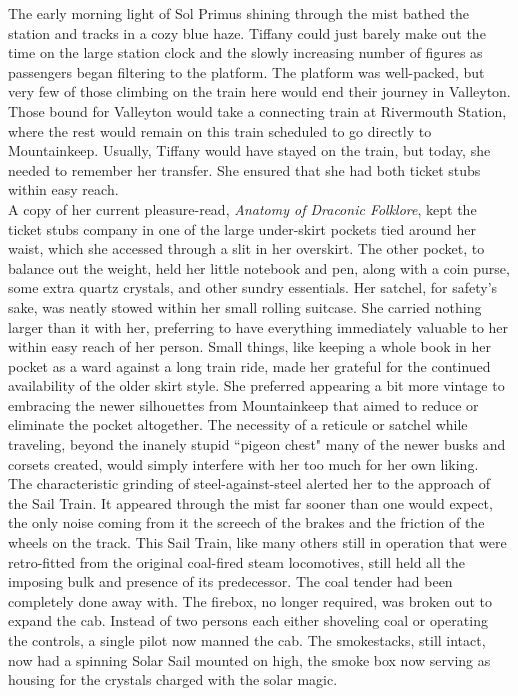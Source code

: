 The early morning light of Sol Primus shining through the mist bathed the station and tracks in a cozy blue haze.
Tiffany could just barely make out the time on the large station clock and the slowly increasing number of figures as passengers began filtering to the platform.
The platform was well-packed, but very few of those climbing on the train here would end their journey in Valleyton.
Those bound for Valleyton would take a connecting train at Rivermouth Station, where the rest would remain on this train scheduled to go directly to Mountainkeep.
Usually, Tiffany would have stayed on the train, but today, she needed to remember her transfer.
She ensured that she had both ticket stubs within easy reach.\\

A copy of her current pleasure-read, \textit{Anatomy of Draconic Folklore}, kept the ticket stubs company in one of the large under-skirt pockets tied around her waist, which she accessed through a slit in her overskirt.
The other pocket, to balance out the weight, held her little notebook and pen, along with a coin purse, some extra quartz crystals, and other sundry essentials.
Her satchel, for safety's sake, was neatly stowed within her small rolling suitcase. 
She carried nothing larger than it with her, preferring to have everything immediately valuable to her within easy reach of her person.
Small things, like keeping a whole book in her pocket as a ward against a long train ride, made her grateful for the continued availability of the older skirt style.
She preferred appearing a bit more vintage to embracing the newer silhouettes from Mountainkeep that aimed to reduce or eliminate the pocket altogether. 
The necessity of a reticule or satchel while traveling, beyond the inanely stupid ``pigeon chest" many of the newer busks and corsets created, would simply interfere with her too much for her own liking.\\

The characteristic grinding of steel-against-steel alerted her to the approach of the Sail Train.
It appeared through the mist far sooner than one would expect, the only noise coming from it the screech of the brakes and the friction of the wheels on the track.
This Sail Train, like many others still in operation that were retro-fitted from the original coal-fired steam locomotives, still held all the imposing bulk and presence of its predecessor.
The coal tender had been completely done away with. 
The firebox, no longer required, was broken out to expand the cab.
Instead of two persons each either shoveling coal or operating the controls, a single pilot now manned the cab.
The smokestacks, still intact, now had a spinning Solar Sail mounted on high, the smoke box now serving as housing for the crystals charged with the solar magic.\\

